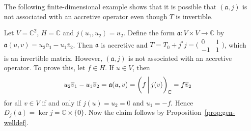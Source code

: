 \documentclass[a4paper,oneside,12pt]{amsart}
\theoremstyle{plain}
\theoremstyle{definition}
\newenvironment{example}
{\pushQED{\qed}

\examplex}
{\popQED\endexamplex}
\begin{document}
The following finite-dimensional example shows that it is possible that $({{\mathfrak{{a}}}},j)$ is not associated with an accretive operator even though $T$ is invertible.
\begin{example}\label{ex:multival}
Let $V={\mathbb{C}}^2$, $H={\mathbb{C}}$ and $j(u_1,u_2)=u_2$. Define the form ${{\mathfrak{{a}}}}\colon V\times V\to{\mathbb{C}}$ by ${{\mathfrak{{a}}}}(u,v)=u_2{\overline{{v}}}_1-u_1{\overline{{v}}}_2$.
Then ${{\mathfrak{{a}}}}$ is accretive and $T=T_0+j^*j=\bigl(\begin{smallmatrix} 0 & 1 \\ -1 & 1\end{smallmatrix}\bigr)$, which is an invertible matrix. However, $({{\mathfrak{{a}}}},j)$ is not associated with an
accretive operator.
To prove this, let $f\in H$. If $u\in V$, then 
\[
    u_2{\overline{{v}}}_1-u_1{\overline{{v}}}_2={{\mathfrak{{a}}}}(u,v)={{\ifthenelse{\equal{auto}{auto}}{\left({f}\mkern3mu{\biggm|}\mkern3mu {j(v)}\right)}{}
\ifthenelse{\equal{auto}{b}}{\bigl({f}\mkern3mu{\biggm|}\mkern3mu {j(v)}\bigr)}{}
\ifthenelse{\equal{auto}{B}}{\Bigl({f}\mkern3mu{\bigm|}\mkern3mu {j(v)}\Bigr)}{}
}}_{\mathbb{C}} = f{\overline{{v}}}_2
\]
for all $v\in V$ if and only if $j(u)=u_2=0$ and $u_1=-f$. Hence $D_j({{\mathfrak{{a}}}})=\ker j={\mathbb{C}}\times\{0\}$. Now the claim follows by Proposition~\ref{prop:gen-welldef}.
\end{example}
\end{document}
